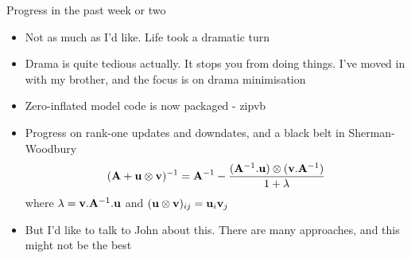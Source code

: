 \documentclass{beamer}
\begin{document}
\begin{frame}{Progress in the past week or two}
\begin{itemize}
\item Not as much as I'd like. Life took a dramatic turn
\item Drama is quite tedious actually. It stops you from doing things. I've moved in with my brother, and
			the focus is on drama minimisation
\item Zero-inflated model code is now packaged - zipvb
\item Progress on rank-one updates and downdates, and a black belt in Sherman-Woodbury
\begin{equation*}
({\bf A} + {\bf u} \otimes {\bf v})^{-1} = {\bf A}^{-1} - \frac{({\bf A}^{-1} . {\bf u}) \otimes ({\bf v} . {\bf A}^{-1})}{1 + \lambda}
\end{equation*}
where $\lambda = {\bf v} . {\bf A}^{-1} . {\bf u}$ and $({\bf u} \otimes {\bf v})_{ij} = {\bf u}_i {\bf v}_j$
\item But I'd like to talk to John about this. There are many approaches, and this might not be the best
\end{itemize}
\end{frame}
\end{document}
